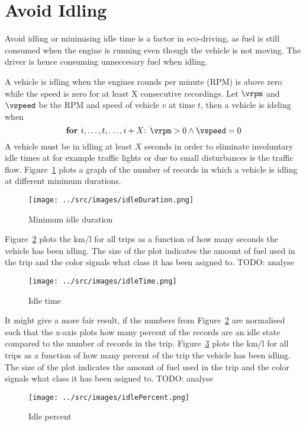\section{Avoid Idling}

Avoid idling or minimising idle time is a factor in eco-driving, as fuel is still consumed when the engine is running even though the vehicle is not moving.
The driver is hence consuming unneccesary fuel when idling.

A vehicle is idling when the engines rounds per minute (RPM) is above zero while the speed is zero for at least X consecutive recordings. %
Let $\vrpm$ and $\vspeed$ be the RPM and speed of vehicle $v$ at time $t$, then a vehicle is ideling when
\[\mbox{\textbf{for }} i, \dots ,t, \dots, i+X \mbox{: }\vrpm> 0 \wedge \vspeed=0 \]
A vehicle must be in idling at least $X$ seconds in order to eliminate involuntary idle times at for example traffic lights or due to small disturbances is the traffic flow.
Figure~\ref{fig:idleDuration} plots a graph of the number of records in which a vehicle is idling at different minimum durations. 

\begin{figure}[htb]
\centering
\texttt{[image: ../src/images/idleDuration.png]}
\caption{Minimum idle duration}
\label{fig:idleDuration}
\end{figure}

Figure~\ref{fig:idleTime} plots the km/l for all trips as a function of how many seconds the vehicle has been idling.
The size of the plot indicates the amount of fuel used in the trip and the color signals what class it has been asigned to.
TODO: analyse
\begin{figure}[htb]
\centering
\texttt{[image: ../src/images/idleTime.png]}
\caption{Idle time}
\label{fig:idleTime}
\end{figure}

It might give a more fair result, if the numbers from Figure~\ref{fig:idleTime} are normalised such that the x-axis plots how many percent of the records are an idle state compared to the number of records in the trip.
Figure~\ref{fig:idlePercent} plots the km/l for all trips as a function of how many percent of the trip the vehicle has been idling.
The size of the plot indicates the amount of fuel used in the trip and the color signals what class it has been asigned to.
TODO: analyse
\begin{figure}[htb]
\centering
\texttt{[image: ../src/images/idlePercent.png]}
\caption{Idle percent}
\label{fig:idlePercent}
\end{figure}

